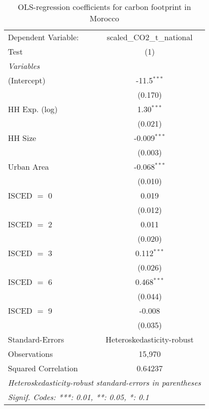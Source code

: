 
\begin{table}[htbp!]
   \centering
   \small
   \begin{adjustbox}{width = 1\textwidth, max height = 0.95\textheight, center}
      \begin{threeparttable}[b]
         \caption{\label{tab:OLS_2_MAR} OLS-regression coefficients for carbon footprint in Morocco}
         \begin{tabular}{lc}
            \tabularnewline \midrule \midrule
            Dependent Variable: & scaled\_CO2\_t\_national\\     
            Test                & (1)\\  
            \midrule
            \emph{Variables}\\
            (Intercept)         & -11.5$^{***}$\\   
                                & (0.170)\\   
            HH Exp. (log)       & 1.30$^{***}$\\   
                                & (0.021)\\   
            HH Size             & -0.009$^{***}$\\   
                                & (0.003)\\   
            Urban Area          & -0.068$^{***}$\\   
                                & (0.010)\\   
            ISCED $=$ 0         & 0.019\\   
                                & (0.012)\\   
            ISCED $=$ 2         & 0.011\\   
                                & (0.020)\\   
            ISCED $=$ 3         & 0.112$^{***}$\\   
                                & (0.026)\\   
            ISCED $=$ 6         & 0.468$^{***}$\\   
                                & (0.044)\\   
            ISCED $=$ 9         & -0.008\\   
                                & (0.035)\\   
            \midrule 
            Standard-Errors     & Heteroskedasticity-robust \\   
            Observations        & 15,970\\  
            Squared Correlation & 0.64237\\  
            \midrule \midrule
            \multicolumn{2}{l}{\emph{Heteroskedasticity-robust standard-errors in parentheses}}\\
            \multicolumn{2}{l}{\emph{Signif. Codes: ***: 0.01, **: 0.05, *: 0.1}}\\
         \end{tabular}
         

\end{threeparttable}
\end{adjustbox}
\end{table}
